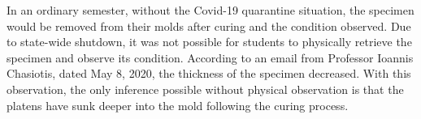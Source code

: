 \tab In an ordinary semester, without the Covid-19 quarantine situation, the specimen would be removed from their molds after curing and the condition observed.  Due to state-wide shutdown, it was not possible for students to physically retrieve the specimen and observe its condition.  According to an email from Professor Ioannis Chasiotis, dated May 8, 2020, the thickness of the specimen decreased.  With this observation, the only inference possible without physical observation is that the platens have sunk deeper into the mold following the curing process.